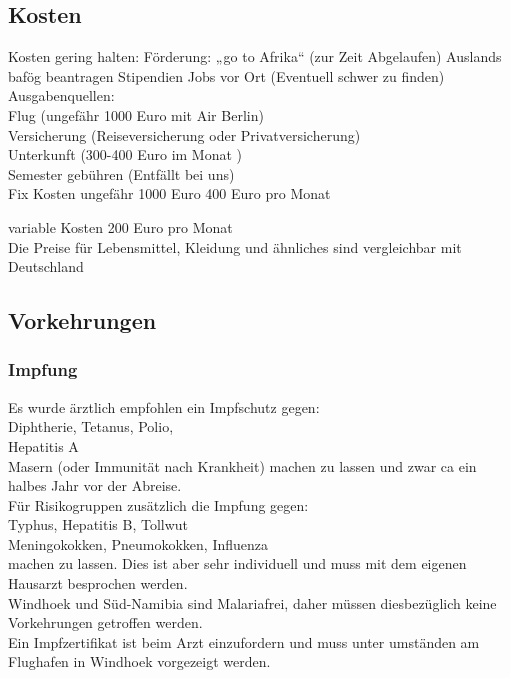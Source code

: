 \documentclass[11pt]{article}
\begin{document}
\subsection{Kosten}
Kosten gering halten:
Förderung: „go to Afrika“ (zur Zeit Abgelaufen)
Auslands bafög beantragen
Stipendien
Jobs vor Ort (Eventuell schwer zu finden)\\

Ausgabenquellen:\\
Flug (ungefähr 1000 Euro mit Air Berlin)\\
Versicherung (Reiseversicherung oder Privatversicherung)\\
Unterkunft (300-400 Euro im Monat )\\
Semester gebühren (Entfällt bei uns)\\

Fix Kosten 		ungefähr 1000 Euro
			400 Euro pro Monat

variable Kosten 	200 Euro pro Monat\\

Die Preise für Lebensmittel, Kleidung und ähnliches sind vergleichbar mit Deutschland

\subsection{Vorkehrungen}
\subsubsection{Impfung}
Es wurde ärztlich empfohlen ein Impfschutz gegen:
\\Diphtherie, Tetanus, Polio,
\\Hepatitis A
\\Masern (oder Immunität nach Krankheit)
machen zu lassen und zwar ca ein halbes Jahr vor der 
Abreise. \\
Für Risikogruppen zusätzlich die Impfung gegen:
\\Typhus, Hepatitis B, Tollwut
\\Meningokokken, Pneumokokken, Influenza
\\machen zu lassen. Dies ist aber sehr individuell und muss mit dem eigenen Hausarzt besprochen werden.
\\
Windhoek und Süd-Namibia sind Malariafrei, daher müssen diesbezüglich keine Vorkehrungen getroffen werden. 
\\
Ein Impfzertifikat ist beim Arzt einzufordern und muss unter umständen am Flughafen in Windhoek vorgezeigt werden.
\end{document}
